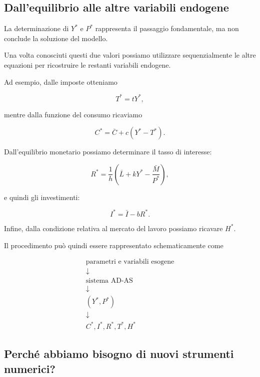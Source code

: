 \subsection{Dall'equilibrio alle altre variabili endogene}

La determinazione di $Y^*$ e $P^*$ rappresenta il passaggio
fondamentale, ma non conclude la soluzione del modello.

Una volta conosciuti questi due valori possiamo utilizzare
sequenzialmente le altre equazioni per ricostruire le restanti
variabili endogene.

Ad esempio, dalle imposte otteniamo

\begin{equation*}
    T^*=tY^*,
\end{equation*}

mentre dalla funzione del consumo ricaviamo

\begin{equation*}
    C^*=\bar{C}+c(Y^*-T^*).
\end{equation*}

Dall'equilibrio monetario possiamo determinare il tasso di interesse:

\begin{equation*}
    R^*
    =
    \frac{1}{h}
    \left(
        \bar{L}+kY^*-\frac{\bar{M}}{P^*}
    \right),
\end{equation*}

e quindi gli investimenti:

\begin{equation*}
    I^*=\bar{I}-bR^*.
\end{equation*}

Infine, dalla condizione relativa al mercato del lavoro possiamo
ricavare $H^*$.

Il procedimento può quindi essere rappresentato schematicamente come

\begin{equation*}
\begin{array}{c}
\text{parametri e variabili esogene}\\
\downarrow\\
\text{sistema AD-AS}\\
\downarrow\\
(Y^*,P^*)\\
\downarrow\\
C^*,I^*,R^*,T^*,H^*
\end{array}
\end{equation*}


\subsection{Perché abbiamo bisogno di nuovi strumenti numerici?}

